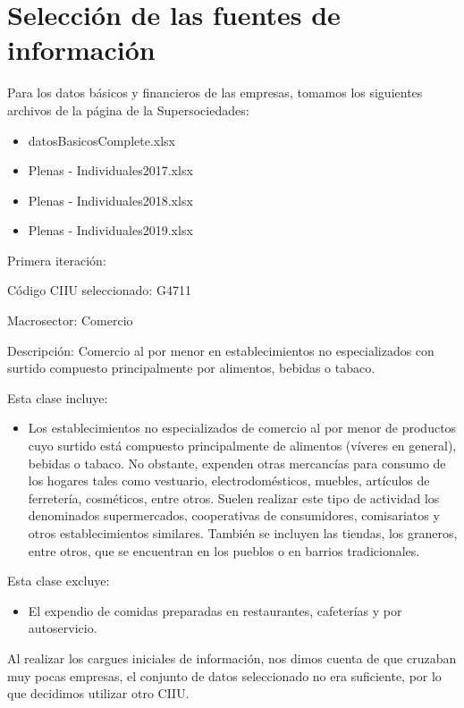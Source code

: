 \documentclass[
  11pt,
  a4paper,
]{book}
\begin{document}
\hypertarget{selecciuxf3n-de-las-fuentes-de-informaciuxf3n}{%
\section{Selección de las fuentes de
información}\label{selecciuxf3n-de-las-fuentes-de-informaciuxf3n}}

Para los datos básicos y financieros de las empresas, tomamos los
siguientes archivos de la página de la Supersociedades:

\begin{itemize}
\item datosBasicosComplete.xlsx
\item Plenas - Individuales2017.xlsx
\item Plenas - Individuales2018.xlsx
\item Plenas - Individuales2019.xlsx
\end{itemize}

Primera iteración:

Código CIIU seleccionado: G4711

Macrosector: Comercio

Descripción: Comercio al por menor en establecimientos no especializados
con surtido compuesto principalmente por alimentos, bebidas o tabaco.

Esta clase incluye:

\begin{itemize}
\item Los establecimientos no especializados de comercio al por menor de productos cuyo surtido está compuesto principalmente de alimentos (víveres en general), bebidas o tabaco. No obstante, expenden otras mercancías para consumo de los hogares tales como vestuario, electrodomésticos, muebles, artículos de ferretería, cosméticos, entre otros. Suelen realizar este tipo de actividad los denominados supermercados, cooperativas de consumidores, comisariatos y otros establecimientos similares. También se incluyen las tiendas, los graneros, entre otros, que se encuentran en los pueblos o en barrios tradicionales.
\end{itemize}

Esta clase excluye:

\begin{itemize}
\item El expendio de comidas preparadas en restaurantes, cafeterías y por autoservicio.
\end{itemize}

Al realizar los cargues iniciales de información, nos dimos cuenta de
que cruzaban muy pocas empresas, el conjunto de datos seleccionado no
era suficiente, por lo que decidimos utilizar otro CIIU.
\end{document}

